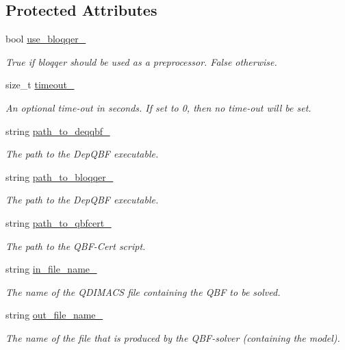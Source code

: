\subsection*{Protected Attributes}
\begin{DoxyCompactItemize}
\item 
bool \hyperlink{classDepQBFExt_a1ac4c3f5db8b564898de69b88e1757e0}{use\-\_\-bloqqer\-\_\-}
\begin{DoxyCompactList}\small\item\em True if bloqqer should be used as a preprocessor. False otherwise. \end{DoxyCompactList}\item 
size\-\_\-t \hyperlink{classDepQBFExt_ac167b3fa37c76fbfabfa855b329a0dfb}{timeout\-\_\-}
\begin{DoxyCompactList}\small\item\em An optional time-\/out in seconds. If set to 0, then no time-\/out will be set. \end{DoxyCompactList}\item 
string \hyperlink{classDepQBFExt_a4c952a6d69e93efc5cd6c5491f85c5b3}{path\-\_\-to\-\_\-deqqbf\-\_\-}
\begin{DoxyCompactList}\small\item\em The path to the Dep\-Q\-B\-F executable. \end{DoxyCompactList}\item 
string \hyperlink{classDepQBFExt_a76b0152b808bde17a2a1324979f82106}{path\-\_\-to\-\_\-bloqqer\-\_\-}
\begin{DoxyCompactList}\small\item\em The path to the Dep\-Q\-B\-F executable. \end{DoxyCompactList}\item 
string \hyperlink{classDepQBFExt_a05676410e9b70c5e83cb13b708e2f178}{path\-\_\-to\-\_\-qbfcert\-\_\-}
\begin{DoxyCompactList}\small\item\em The path to the Q\-B\-F-\/\-Cert script. \end{DoxyCompactList}\item 
string \hyperlink{classExtQBFSolver_a04d2ff483c22a11344e46d66ae7e76b1}{in\-\_\-file\-\_\-name\-\_\-}
\begin{DoxyCompactList}\small\item\em The name of the Q\-D\-I\-M\-A\-C\-S file containing the Q\-B\-F to be solved. \end{DoxyCompactList}\item 
string \hyperlink{classExtQBFSolver_a0efb35aa9b807dec521ad3406eaf664d}{out\-\_\-file\-\_\-name\-\_\-}
\begin{DoxyCompactList}\small\item\em The name of the file that is produced by the Q\-B\-F-\/solver (containing the model). \end{DoxyCompactList}\end{DoxyCompactItemize}

